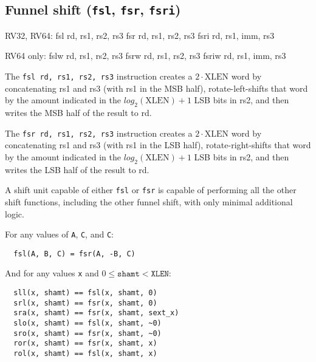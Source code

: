 

\subsection{Funnel shift ({\tt fsl}, {\tt fsr}, {\tt fsri})}

\begin{rvb}
  RV32, RV64:
    fsl rd, rs1, rs2, rs3
    fsr rd, rs1, rs2, rs3
    fsri rd, rs1, imm, rs3

  RV64 only:
    fslw rd, rs1, rs2, rs3
    fsrw rd, rs1, rs2, rs3
    fsriw rd, rs1, imm, rs3
\end{rvb}

The {\tt fsl rd, rs1, rs2, rs3} instruction creates a $2\cdot\textrm{XLEN}$ word
by concatenating rs1 and rs3 (with rs1 in the MSB half), rotate-left-shifts that
word by the amount indicated in the $log_2(\textrm{XLEN})+1$ LSB bits in rs2, and
then writes the MSB half of the result to rd.

The {\tt fsr rd, rs1, rs2, rs3} instruction creates a $2\cdot\textrm{XLEN}$ word
by concatenating rs1 and rs3 (with rs1 in the LSB half), rotate-right-shifts that
word by the amount indicated in the $log_2(\textrm{XLEN})+1$ LSB bits in rs2, and
then writes the LSB half of the result to rd.





A shift unit capable of either {\tt fsl} or {\tt fsr} is capable of performing all
the other shift functions, including the other funnel shift, with only minimal additional
logic.

For any values of {\tt A}, {\tt C}, and {\tt C}:

\begin{minipage}{\linewidth}
\begin{verbatim}
  fsl(A, B, C) = fsr(A, -B, C)
\end{verbatim}
\end{minipage}

And for any values {\tt x} and $0 \le \texttt{shamt} < \texttt{XLEN}$:

\begin{minipage}{\linewidth}
\begin{verbatim}
  sll(x, shamt) == fsl(x, shamt, 0)
  srl(x, shamt) == fsr(x, shamt, 0)
  sra(x, shamt) == fsr(x, shamt, sext_x)
  slo(x, shamt) == fsl(x, shamt, ~0)
  sro(x, shamt) == fsr(x, shamt, ~0)
  ror(x, shamt) == fsr(x, shamt, x)
  rol(x, shamt) == fsl(x, shamt, x)
\end{verbatim}
\end{minipage}

